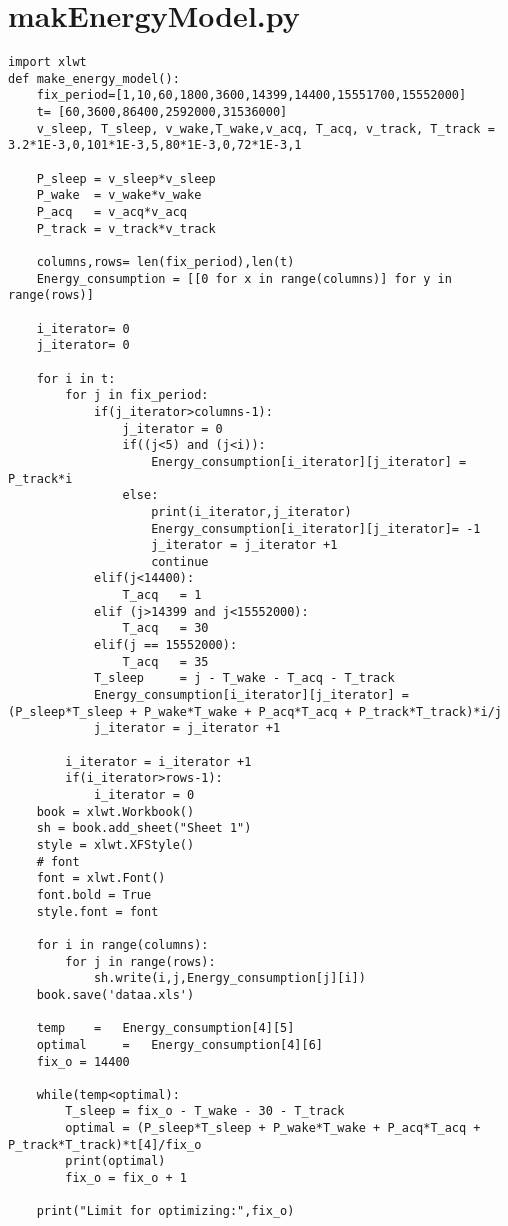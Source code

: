 \begin{appendices}
\begin{lstlisting}
\end{lstlisting}
\label{Appendix:L76GNSS.py}
\chapter{makEnergyModel.py}
\begin{lstlisting}
import xlwt
def make_energy_model():
    fix_period=[1,10,60,1800,3600,14399,14400,15551700,15552000]
    t= [60,3600,86400,2592000,31536000]
    v_sleep, T_sleep, v_wake,T_wake,v_acq, T_acq, v_track, T_track = 3.2*1E-3,0,101*1E-3,5,80*1E-3,0,72*1E-3,1

    P_sleep = v_sleep*v_sleep
    P_wake  = v_wake*v_wake
    P_acq   = v_acq*v_acq
    P_track = v_track*v_track

    columns,rows= len(fix_period),len(t)
    Energy_consumption = [[0 for x in range(columns)] for y in range(rows)]

    i_iterator= 0
    j_iterator= 0

    for i in t:
        for j in fix_period:
            if(j_iterator>columns-1):
                j_iterator = 0   
                if((j<5) and (j<i)):
                    Energy_consumption[i_iterator][j_iterator] = P_track*i
                else:
                    print(i_iterator,j_iterator)
                    Energy_consumption[i_iterator][j_iterator]= -1
                    j_iterator = j_iterator +1
                    continue
            elif(j<14400):
                T_acq   = 1
            elif (j>14399 and j<15552000):
                T_acq   = 30      
            elif(j == 15552000):
                T_acq   = 35
            T_sleep     = j - T_wake - T_acq - T_track 
            Energy_consumption[i_iterator][j_iterator] = (P_sleep*T_sleep + P_wake*T_wake + P_acq*T_acq + P_track*T_track)*i/j
            j_iterator = j_iterator +1

        i_iterator = i_iterator +1
        if(i_iterator>rows-1):
            i_iterator = 0  
    book = xlwt.Workbook()
    sh = book.add_sheet("Sheet 1")
    style = xlwt.XFStyle()
    # font
    font = xlwt.Font()
    font.bold = True
    style.font = font
    
    for i in range(columns):
        for j in range(rows):
            sh.write(i,j,Energy_consumption[j][i])
    book.save('dataa.xls')

    temp    =   Energy_consumption[4][5]
    optimal     =   Energy_consumption[4][6]
    fix_o = 14400

    while(temp<optimal):  
        T_sleep = fix_o - T_wake - 30 - T_track
        optimal = (P_sleep*T_sleep + P_wake*T_wake + P_acq*T_acq + P_track*T_track)*t[4]/fix_o
        print(optimal)
        fix_o = fix_o + 1

    print("Limit for optimizing:",fix_o)

\end{lstlisting}
\label{Appendix:make_energy_model.py}
\end{appendices}